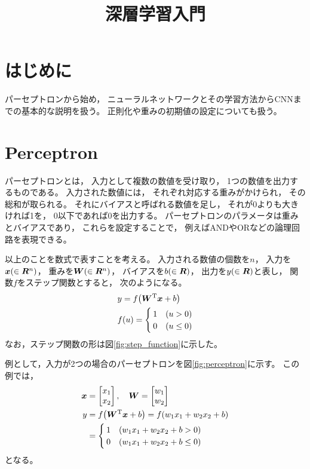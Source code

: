 \documentclass[class=jsarticle, crop=false, dvipdfmx, fleqn]{standalone}
\title{深層学習入門}
\begin{document}
\maketitle
\tableofcontents


\section{はじめに}

パーセプトロンから始め，
ニューラルネットワークとその学習方法からCNNまでの基本的な説明を扱う。
正則化や重みの初期値の設定についても扱う。



\section{Perceptron}
\label{sec:perceptron}

パーセプトロンとは，
入力として複数の数値を受け取り，
1つの数値を出力するものである。
入力された数値には，
それぞれ対応する重みがかけられ，
その総和が取られる。
それにバイアスと呼ばれる数値を足し，
それが0よりも大きければ1を，
0以下であれば0を出力する。
パーセプトロンのパラメータは重みとバイアスであり，
これらを設定することで，
例えばANDやORなどの論理回路を表現できる。

以上のことを数式で表すことを考える。
入力される数値の個数を$n$，
入力を$\bm{x} \qty(\in \bm{R}^n)$，
重みを$\bm{W} \qty(\in \bm{R}^n)$，
バイアスを$b\qty(\in \bm{R})$，
出力を$y\qty(\in \bm{R})$と表し，
関数$f$をステップ関数とすると，
次のようになる。
\begin{align}
& y = f \qty(\bm{W}^\mathrm{T} \bm{x} + b) \\
& f(u) =
	\begin{cases}
		1 & (u > 0) \\
		0 & (u \leq 0)
	\end{cases}
\end{align}
なお，ステップ関数の形は図\ref{fig:step_function}に示した。

例として，入力が2つの場合のパーセプトロンを図\ref{fig:perceptron}に示す。
この例では，
\begin{align}
\bm{x} & = \begin{bmatrix} x_1 \\ x_2 \end{bmatrix}, \quad
\bm{W} = \begin{bmatrix} w_1 \\ w_2 \end{bmatrix} \\
y & = f\qty(\bm{W}^\mathrm{T} \bm{x} + b) = f\qty(w_1 x_1 + w_2 x_2 + b) \\
	 & =
	 	\begin{cases}
			1 & \qty(w_1 x_1 + w_2 x_2 + b > 0) \\
			0 & \qty(w_1 x_1 + w_2 x_2 + b \leq 0) 
		\end{cases}
\end{align}
となる。
\end{document}
